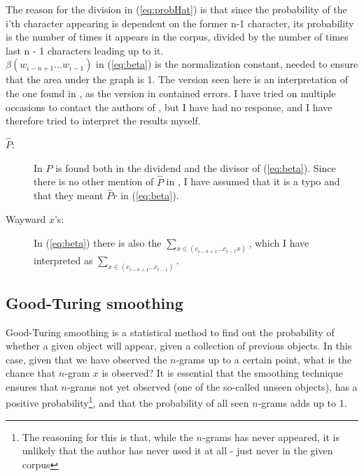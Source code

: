 The reason for the division in (\ref{eq:probHat}) is that since the probability of the i'th character appearing is dependent on the former n-1 character, its probability is the number of times it appears in the corpus, divided by the number of times last n - 1 characters leading up to it.\\

$\beta (w_{i - n + 1}\ldots w_{i -1})$ in (\ref{eq:beta}) is the normalization constant, needed to ensure that the area under the graph is 1. The version seen here is an interpretation of the one found in \cite{nr4}, as the version in \cite{nr4} contained errors. I have tried on multiple occasions to contact the authors of \cite{nr4}, but I have had no response, and I have therefore tried to interpret the results myself.
\begin{description}
\item[$\hat{P}$:]  In \cite{nr4} $\hat{P}$ is found  both in the dividend and the divisor of (\ref{eq:beta}). Since there is no other mention of  $\hat{P}$ in \cite{nr4}, I have assumed that it is a typo and that they meant $\hat{P}r$ in (\ref{eq:beta}).
\item[Wayward $x$'s:] In (\ref{eq:beta}) there is also the $\sum_{x \in (c_{i - n + 1} \ldots c_{i-1} x)}$, which I have interpreted as $\sum_{x \in (c_{i - n + 1} \ldots c_{i-1})}$.  
\end{description}

\subsection{Good-Turing smoothing}
\label{Good-Turing}
Good-Turing smoothing is a statistical method to find out the probability of whether a given object will appear, given a collection of previous objects. In this case, given that we have observed the $n$-grams up to a certain point, what is the chance that $n$-gram $x$ is observed? It is essential that the smoothing technique ensures that $n$-grams not yet observed (one of the so-called unseen objects), has a positive probability\footnote{The reasoning for this is that, while the $n$-grams has never appeared, it is unlikely that the author has never used it at all - just never in the given corpus}, and that the probability of all seen $n$-grams adds up to 1.\\

